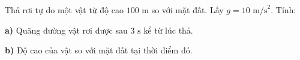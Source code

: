 \begin{ex}
	Thả rơi tự do một vật từ độ cao $100\text{ m}$ so với mặt đất. Lấy $g = 10\text{ m/s}^2$. Tính:
	\par \textbf{a)} Quãng đường vật rơi được sau $3\text{ s}$ kể từ lúc thả. \par \textbf{b)} Độ cao của vật so với mặt đất tại thời điểm đó.
\end{ex}

